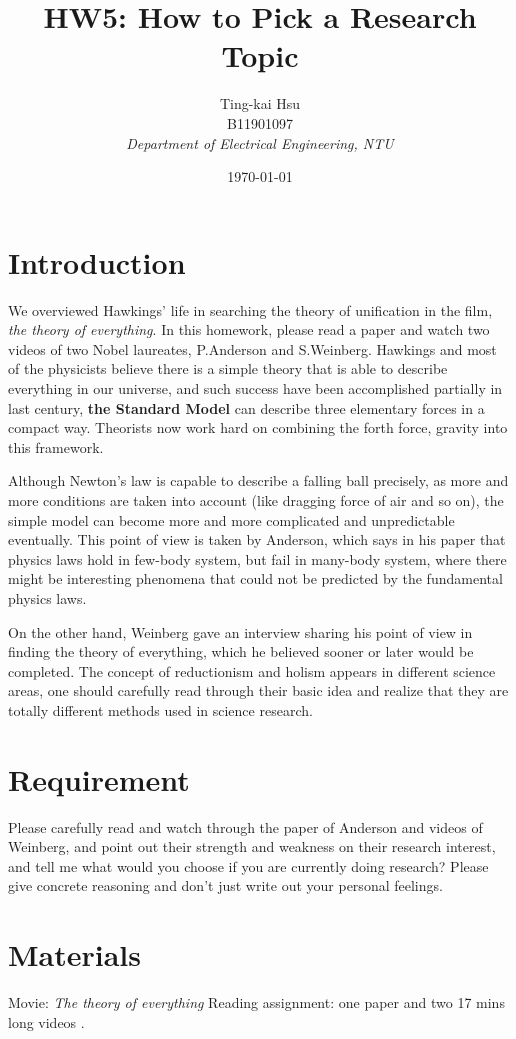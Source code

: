 \documentclass[12pt,a4paper]{article}
\title{HW5: How to Pick a Research Topic}
\author{
    Ting-kai Hsu\\
    B11901097\\
    \textit{Department of Electrical Engineering, NTU}
}
\date{\today}
\numberwithin{equation}{section}
\begin{document}
\maketitle

\tableofcontents
\section{Introduction}
We overviewed Hawkings' life in searching the theory of unification in the film, \textit{the theory of everything}. In this homework, please read a paper \cite{doi:10.1126/science.177.4047.393} and watch two videos \cite{Weinberg2021} \cite{Weinberg2021Part2} of two Nobel laureates, P.Anderson and S.Weinberg. Hawkings and most of the physicists believe there is a simple theory that is able to describe everything in our universe, and such success have been accomplished partially in last century, \textbf{the Standard Model} can describe three elementary forces in a compact way. Theorists now work hard on combining the forth force, gravity into this framework.

Although Newton's law is capable to describe a falling ball precisely, as more and more conditions are taken into account (like dragging force of air and so on), the simple model can become more and more complicated and unpredictable eventually. This point of view is taken by Anderson, which says in his paper \cite{doi:10.1126/science.177.4047.393} that physics laws hold in few-body system, but fail in many-body system, where there might be interesting phenomena that could not be predicted by the fundamental physics laws.

On the other hand, Weinberg gave an interview sharing his point of view in finding the theory of everything, which he believed sooner or later would be completed. The concept of reductionism and holism \cite{WikipediaReductionism} \cite{WikipediaHolism} appears in different science areas, one should carefully read through their basic idea and realize that they are totally different methods used in science research.

\section{Requirement}
Please carefully read and watch through the paper of Anderson and videos of Weinberg, and point out their strength and weakness on their research interest, and tell me what would you choose if you are currently doing research? Please give concrete reasoning and don't just write out your personal feelings.
\section{Materials}
Movie: \textit{The theory of everything}
Reading assignment: one paper \cite{doi:10.1126/science.177.4047.393} and two 17 mins long videos \cite{Weinberg2021} \cite{Weinberg2021Part2}.


\end{document}
